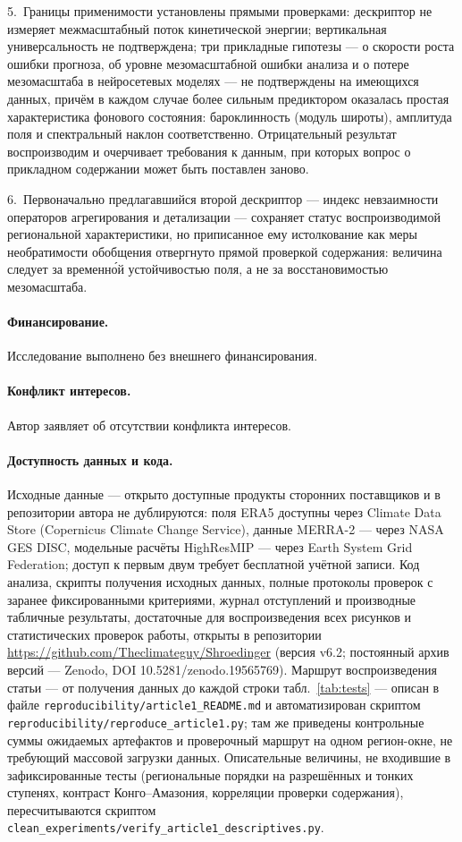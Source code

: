\documentclass[11pt,a4paper]{article}
\begin{document}
5.~Границы применимости установлены прямыми проверками: дескриптор не измеряет межмасштабный поток кинетической энергии; вертикальная универсальность не подтверждена; три прикладные гипотезы --- о скорости роста ошибки прогноза, об уровне мезомасштабной ошибки анализа и о потере мезомасштаба в нейросетевых моделях --- не подтверждены на имеющихся данных, причём в каждом случае более сильным предиктором оказалась простая характеристика фонового состояния: бароклинность (модуль широты), амплитуда поля и спектральный наклон соответственно. Отрицательный результат воспроизводим и очерчивает требования к данным, при которых вопрос о прикладном содержании может быть поставлен заново.

6.~Первоначально предлагавшийся второй дескриптор --- индекс невзаимности операторов агрегирования и детализации --- сохраняет статус воспроизводимой региональной характеристики, но приписанное ему истолкование как меры необратимости обобщения отвергнуто прямой проверкой содержания: величина следует за временн\'{о}й устойчивостью поля, а не за восстановимостью мезомасштаба.

\paragraph{Финансирование.} Исследование выполнено без внешнего финансирования.

\paragraph{Конфликт интересов.} Автор заявляет об отсутствии конфликта интересов.

\paragraph{Доступность данных и кода.} Исходные данные --- открыто доступные продукты сторонних поставщиков и в репозитории автора не дублируются: поля ERA5 доступны через Climate Data Store (Copernicus Climate Change Service), данные MERRA-2 --- через NASA GES DISC, модельные расчёты HighResMIP --- через Earth System Grid Federation; доступ к первым двум требует бесплатной учётной записи. Код анализа, скрипты получения исходных данных, полные протоколы проверок с заранее фиксированными критериями, журнал отступлений и производные табличные результаты, достаточные для воспроизведения всех рисунков и статистических проверок работы, открыты в репозитории \url{https://github.com/Theclimateguy/Shroedinger} (версия v6.2; постоянный архив версий --- Zenodo, DOI 10.5281/zenodo.19565769). Маршрут воспроизведения статьи --- от получения данных до каждой строки табл.~\ref{tab:tests} --- описан в файле \texttt{reproducibility/article1\_README.md} и автоматизирован скриптом \texttt{reproducibility/reproduce\_article1.py}; там же приведены контрольные суммы ожидаемых артефактов и проверочный маршрут на одном регион-окне, не требующий массовой загрузки данных. Описательные величины, не входившие в зафиксированные тесты (региональные порядки на разрешённых и тонких ступенях, контраст Конго--Амазония, корреляции проверки содержания), пересчитываются скриптом \texttt{clean\_experiments/}\allowbreak\texttt{verify\_article1\_}\allowbreak\texttt{descriptives.py}.

\printbibliography[title={Список литературы}]
\end{document}
